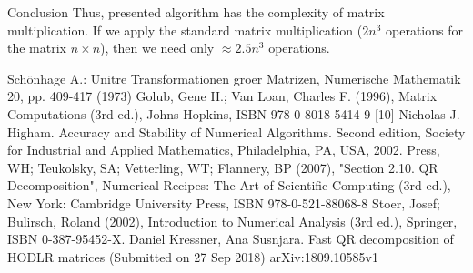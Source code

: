 \documentclass[pdf]{beamer}
\begin{document}
\begin{frame}{ Conclusion}
Thus, presented algorithm has the complexity of matrix multiplication. If we apply the standard matrix multiplication ($ 2n ^ 3 $ operations for the matrix ${n \times n}$), then we need only $\approx  2.5 n ^ 3 $ operations.
\end{frame}
 
 \begin{frame}
 \begin{thebibliography}{5}
 Schönhage A.: Unitre Transformationen groer Matrizen, Numerische 
Mathematik 20, pp. 409-417 (1973)
Golub, Gene H.; Van Loan, Charles F. (1996), Matrix Computations (3rd ed.), Johns Hopkins, ISBN 978-0-8018-5414-9
[10] Nicholas J. Higham. Accuracy and Stability of Numerical Algorithms. Second
edition, Society for Industrial and Applied Mathematics, Philadelphia, PA,
USA, 2002.
Press, WH; Teukolsky, SA; Vetterling, WT; Flannery, BP (2007), "Section 2.10. QR Decomposition", Numerical Recipes: The Art of Scientific Computing (3rd ed.), New York: Cambridge University Press, ISBN 978-0-521-88068-8
Stoer, Josef; Bulirsch, Roland (2002), Introduction to Numerical Analysis (3rd ed.), Springer, ISBN 0-387-95452-X.  
Daniel Kressner, Ana Susnjara. Fast QR decomposition of HODLR matrices
(Submitted on 27 Sep 2018)  arXiv:1809.10585v1 
\end{thebibliography}
 \end{frame}
 
\end{document}

